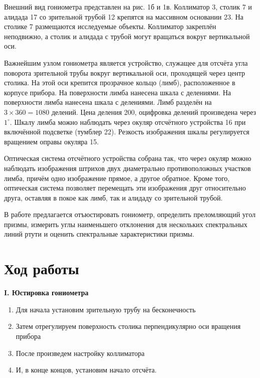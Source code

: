 \documentclass[a4paper,12pt]{article} %
\begin{document}
	Внешний вид гониометра представлен на рис. 1б и 1в. Коллиматор 3, столик 7 и алидада 17 со зрительной трубой 12 крепятся на массивном основании 23. На столике 7 размещаются исследуемые объекты. Коллиматор закреплён неподвижно, а столик и алидада с трубой могут вращаться вокруг вертикальной оси.
	
	Важнейшим узлом гониометра является устройство, служащее для отсчёта угла поворота зрительной трубы вокруг вертикальной оси, проходящей через центр столика. На этой оси крепится прозрачное кольцо (лимб), расположенное в корпусе прибора. На поверхности лимба нанесена шкала с делениями. На поверхности лимба нанесена шкала с делениями. Лимб разделён на $3 \times 360 = 1080$ делений. Цена деления 200, оцифровка делений произведена через $1^\circ$. Шкалу лимба можно наблюдать через окуляр отсчётного устройства 16 при включённой подсветке (тумблер 22). Резкость изображения шкалы регулируется вращением оправы окуляра 15.
	
	Оптическая система отсчётного устройства собрана так, что через окуляр можно наблюдать изображения штрихов двух диаметрально противоположных участков лимба, причём одно изображение прямое, а другое обратное. Кроме того, оптическая система позволяет перемещать эти изображения друг относительно друга, оставляя в покое как лимб, так и алидаду со зрительной трубой.
	
	\vspace{40mm}
	В работе предлагается отъюстировать гониометр, определить преломляющий угол призмы, измерить углы наименьшего отклонения для нескольких спектральных линий ртути и оценить спектральные характеристики призмы.
	
	\newpage
	
	\section*{Ход работы}
	
	\begin{center}
		\textbf{I. Юстировка гониометра}
	\end{center}

	\begin{enumerate}
	\item Для начала установим зрительную трубу на бесконечность
	\item Затем отрегулируем поверхность столика перпендикулярно оси вращения прибора 
	\item После произведем настройку коллиматора
	\item И, в конце концов, установим начало отсчёта.
	\end{enumerate}
\end{document}
